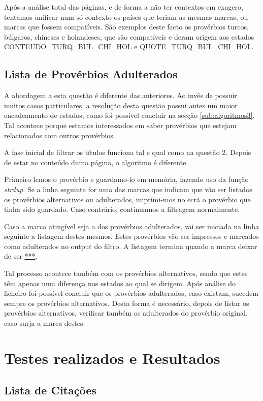 \documentclass[11pt,a4paper]{report}
\begin{document}
Após a análise total das páginas, e de forma a não ter contextos em exagero, tentamos unificar num só contexto os países que teriam as mesmas marcas, ou marcas que fossem compatíveis. São exemplos deste facto os provérbios turcos, búlgaros, chineses e holandeses, que são compatíveis e deram origem aos estados CONTEUDO\_TURQ\_BUL\_CHI\_HOL e QUOTE\_TURQ\_BUL\_CHI\_HOL.

\subsection{Lista de Provérbios Adulterados}

A abordagem a esta questão é diferente das anteriores. Ao invês de possuir muitos casos particulares, a resolução desta questão possui antes um maior encadeamento de estados, como foi possível concluir na secção \ref{sub:algoritmos3}. Tal acontece porque estamos interessados em saber provérbios que estejam relacionados com outros provérbios.

A fase inicial de filtrar os títulos funciona tal e qual como na questão 2. Depois de estar no conteúdo duma página, o algoritmo é diferente.

Primeiro lemos o provérbio e guardamo-lo em memória, fazendo uso da função \textit{strdup}. Se a linha seguinte for uma das marcas que indicam que vão ser listados os provérbios alternativos ou adulterados, imprimi-mos no ecrã o provérbio que tinha sido guardado. Caso contrário, continuamos a filtragem normalmente.

Caso a marca atingível seja a dos provérbios adulterados, vai ser iniciada na linha seguinte a listagem destes mesmos. Estes provérbios vão ser impressos e marcados como adulterados no output do filtro. A listagem termina quando a marca deixar de ser \underline{***}.

Tal processo acontece também com os provérbios alternativos, sendo que estes têm apenas uma diferença nos estados ao qual se dirigem. Após análise do ficheiro foi possível concluir que os provérbios adulterados, caso existam, sucedem sempre os provérbios alternativos. Desta forma é necessário, depois de listar os provérbios alternativos, verificar também os adulterados do provérbio original, caso surja a marca destes.


\section{Testes realizados e Resultados}
\subsection{Lista de Citações}
\end{document}
